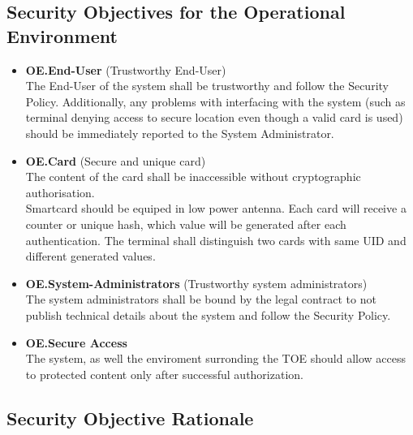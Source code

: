 \documentclass[10pt,titlepage]{article}
\begin{document}
\subsection{Security Objectives for the Operational Environment}
\begin{itemize}

\item \textbf{OE.End-User} (Trustworthy End-User) \\
The End-User of the system shall be trustworthy and follow the Security Policy. Additionally, any problems with interfacing with the system (such as terminal denying access to secure location even though a valid card is used) should be immediately reported to the System Administrator.

\item \textbf{OE.Card} (Secure and unique card) \\
The content of the card shall be inaccessible without cryptographic authorisation.\\
Smartcard should be equiped in low power antenna.
Each card will receive a counter or unique hash, which value will be generated after each authentication. The terminal shall distinguish two cards with same UID and different generated values.

\item \textbf{OE.System-Administrators} (Trustworthy system administrators) \\
The system administrators shall be bound by the legal contract to not publish technical details about the system and follow the Security Policy.

\item \textbf{OE.Secure Access} \\
The system, as well the enviroment surronding the TOE should allow access to protected content only after successful authorization.

\end{itemize}
\subsection{Security Objective Rationale}
\end{document}
